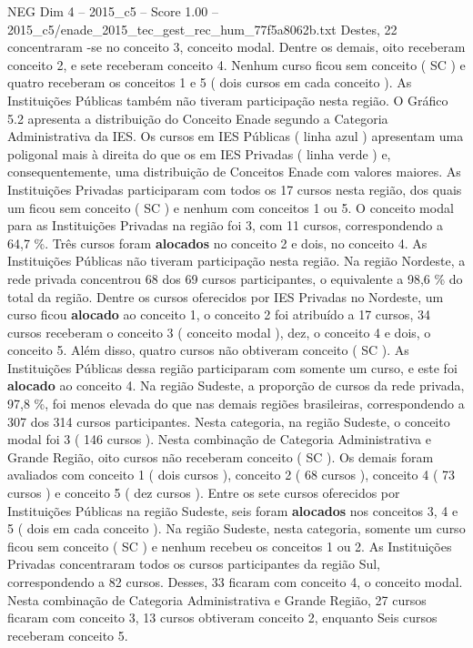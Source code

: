 \begin{textsample}{NEG Dim 4 – 2015\_c5 – Score 1.00 – 2015\_c5/enade\_2015\_tec\_gest\_rec\_hum\_77f5a8062b.txt}
Destes, 22 concentraram -se no conceito 3, conceito modal.
Dentre os demais, oito receberam conceito 2, e sete receberam conceito 4.
Nenhum curso ficou sem conceito ( SC ) e quatro receberam os conceitos 1 e 5 ( dois cursos em cada conceito ).
As Instituições Públicas também não tiveram participação nesta região.
O Gráfico 5.2 apresenta a distribuição do Conceito Enade segundo a Categoria Administrativa da IES.
Os cursos em IES Públicas ( linha azul ) apresentam uma poligonal mais à direita do que os em IES Privadas ( linha verde ) e, consequentemente, uma distribuição de Conceitos Enade com valores maiores.
As Instituições Privadas participaram com todos os 17 cursos nesta região, dos quais um ficou sem conceito ( SC ) e nenhum com conceitos 1 ou 5.
O conceito modal para as Instituições Privadas na região foi 3, com 11 cursos, correspondendo a 64,7 \%.
Três cursos foram \textbf{alocados} no conceito 2 e dois, no conceito 4.
As Instituições Públicas não tiveram participação nesta região.
Na região Nordeste, a rede privada concentrou 68 dos 69 cursos participantes, o equivalente a 98,6 \% do total da região.
Dentre os cursos oferecidos por IES Privadas no Nordeste, um curso ficou \textbf{alocado} ao conceito 1, o conceito 2 foi atribuído a 17 cursos, 34 cursos receberam o conceito 3 ( conceito modal ), dez, o conceito 4 e dois, o conceito 5.
Além disso, quatro cursos não obtiveram conceito ( SC ).
As Instituições Públicas dessa região participaram com somente um curso, e este foi \textbf{alocado} ao conceito 4.
Na região Sudeste, a proporção de cursos da rede privada, 97,8 \%, foi menos elevada do que nas demais regiões brasileiras, correspondendo a 307 dos 314 cursos participantes.
Nesta categoria, na região Sudeste, o conceito modal foi 3 ( 146 cursos ).
Nesta combinação de Categoria Administrativa e Grande Região, oito cursos não receberam conceito ( SC ).
Os demais foram avaliados com conceito 1 ( dois cursos ), conceito 2 ( 68 cursos ), conceito 4 ( 73 cursos ) e conceito 5 ( dez cursos ).
Entre os sete cursos oferecidos por Instituições Públicas na região Sudeste, seis foram \textbf{alocados} nos conceitos 3, 4 e 5 ( dois em cada conceito ).
Na região Sudeste, nesta categoria, somente um curso ficou sem conceito ( SC ) e nenhum recebeu os conceitos 1 ou 2.
As Instituições Privadas concentraram todos os cursos participantes da região Sul, correspondendo a 82 cursos.
Desses, 33 ficaram com conceito 4, o conceito modal.
Nesta combinação de Categoria Administrativa e Grande Região, 27 cursos ficaram com conceito 3, 13 cursos obtiveram conceito 2, enquanto Seis cursos receberam conceito 5.

\end{textsample}
